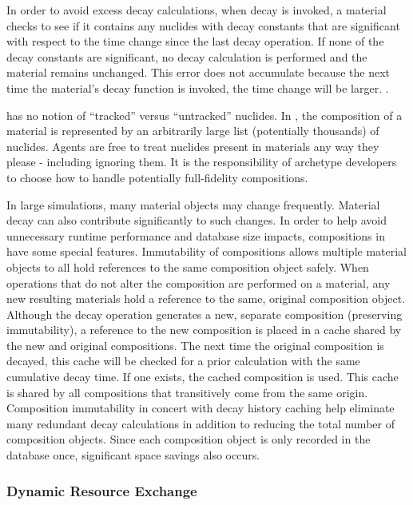 In order to avoid excess decay calculations, when decay 
is invoked, a material checks to see if it contains any nuclides with decay
constants that are significant with respect to the time change since the last
decay operation.  If none of the decay constants are significant, no decay
calculation is performed and the material remains unchanged.  This error does
not accumulate because the next time the material's decay function is invoked,
the time change will be larger. 
.

\Cyclus has no notion of ``tracked'' versus ``untracked'' nuclides.  In \Cyclus, the composition of a material
is represented by an arbitrarily large list (potentially thousands) of
nuclides.  Agents are free to treat nuclides present in materials any way they
please - including ignoring them.  It is the responsibility of archetype
developers to choose how to handle potentially full-fidelity compositions.

In large simulations, many material objects may change frequently.
Material decay can also contribute significantly to such changes.  In order to
help avoid unnecessary runtime performance and database size impacts,
compositions in \Cyclus have some special features.
Immutability of compositions allows multiple material objects to all hold
references to the same composition object safely.  When operations that do not 
alter the composition are performed on a material, any new resulting
materials hold a reference to the same, original composition object.
Although the decay operation generates a new, separate composition (preserving
immutability), a reference to the new composition is placed in a cache shared
by the new and original compositions. The next time the original
composition is decayed, this cache will be checked for a prior calculation
with the same cumulative decay time.  If one exists, the cached composition is
used.  This cache is shared by all compositions that transitively come from
the same origin.  Composition immutability in concert with decay history
caching help eliminate many redundant decay calculations in addition to
reducing the total number of composition objects.  Since each composition
object is only recorded in the database once, significant space savings also
occurs. 

\subsubsection{Dynamic Resource Exchange}

